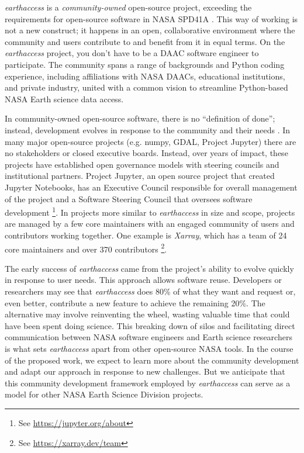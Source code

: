 \documentclass{ROSES-NASA-proposal}
\newcommand{\earthaccess}{\textit{earthaccess}\xspace} %
\begin{document}
\earthaccess is a \textit{community-owned} open-source project, exceeding the requirements for open-source software in NASA SPD41A \citep{SPD41A}. This way of working is not a new construct; it happens in an open, collaborative environment where the community and users contribute to and benefit from it in equal terms. On the \earthaccess project, you don't have to be a DAAC software engineer to participate. The community spans a range of backgrounds and Python coding experience, including affiliations with NASA DAACs, educational institutions, and private industry, united with a common vision to streamline Python-based NASA Earth science data access. 

In community-owned open-source software, there is no “definition of done”; instead, development evolves in response to the community and their needs \citep{eghbal_working_2020}. In many major open-source projects (e.g. numpy, GDAL, Project Jupyter) there are no stakeholders or closed executive boards. Instead, over years of impact, these projects have established open governance models with steering councils and institutional partners. Project Jupyter, an open source project that created Jupyter Notebooks, has an Executive Council responsible for overall management of the project and a Software Steering Council that oversees software development \footnote{See \url{https://jupyter.org/about}}. In projects more similar to \earthaccess in size and scope, projects are managed by a few core maintainers with an engaged community of users and contributors working together. One example is \textit{Xarray}, which has a team of 24 core maintainers and over 370 contributors \footnote{See \url{https://xarray.dev/team}}.

The early success of \earthaccess came from the project's ability to evolve quickly in response to user needs. This approach allows software reuse. Developers or researchers may see that \earthaccess does 80\% of what they want and request or, even better, contribute a new feature to achieve the remaining 20\%. The alternative may involve reinventing the wheel, wasting valuable time that could have been spent doing science. This breaking down of silos and facilitating direct communication between NASA software engineers and Earth science researchers is what sets \earthaccess apart from other open-source NASA tools.  In the course of the proposed work, we expect to learn more about the community development and adapt our approach in response to new challenges. But we anticipate that this community development framework employed by \earthaccess can serve as a model for other NASA Earth Science Division projects. 
\end{document}
